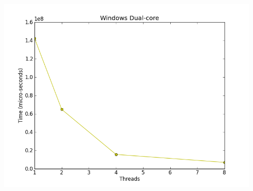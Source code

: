 \documentclass[12pt]{article}
\begin{document}
\includegraphics[scale=0.4]{output/graphs/win_multicore.png}
\end{document}

